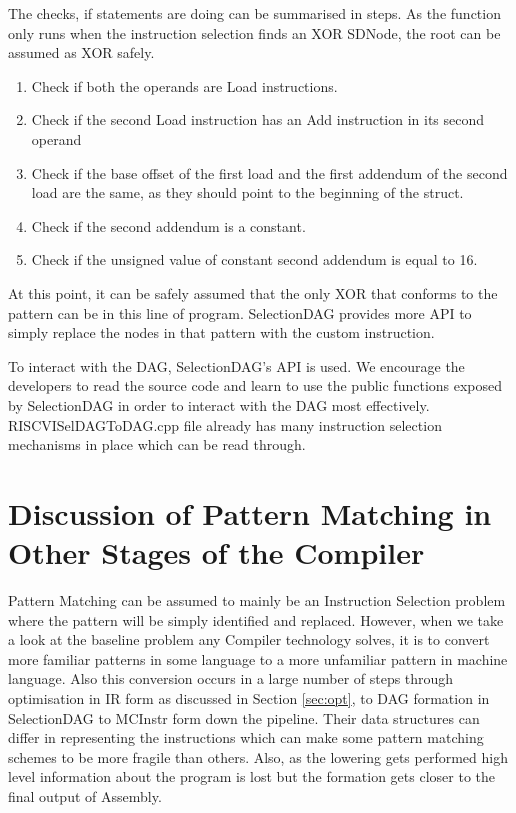The checks, if statements are doing can be summarised in steps. As the function only runs when the instruction selection finds an XOR SDNode, the root can be assumed as XOR safely.
\begin{enumerate}
    \item Check if both the operands are Load instructions.
    \item Check if the second Load instruction has an Add instruction in its second operand
    \item Check if the base offset of the first load and the first addendum of the second load are the same, as they should point to the beginning of the struct.
    \item Check if the second addendum is a constant.
    \item Check if the unsigned value of constant second addendum is equal to 16.
\end{enumerate}

At this point, it can be safely assumed that the only XOR that conforms to the pattern can be in this line of program. SelectionDAG provides more API to simply replace the nodes in that pattern with the custom instruction.


To interact with the DAG, SelectionDAG's API is used. We encourage the developers to read the source code and learn to use the public functions exposed by SelectionDAG in order to interact with the DAG most effectively. RISCVISelDAGToDAG.cpp file already has many instruction selection mechanisms in place which can be read through. 

\section{Discussion of Pattern Matching in Other Stages of the Compiler}
Pattern Matching can be assumed to mainly be an Instruction Selection problem where the pattern will be simply identified and replaced. However, when we take a look at the baseline problem any Compiler technology solves, it is to convert more familiar patterns in some language to a more unfamiliar pattern in machine language. Also this conversion occurs in a large number of steps through optimisation in IR form as discussed in Section \ref{sec:opt}, to DAG formation in SelectionDAG to MCInstr form down the pipeline. Their data structures can differ in representing the instructions which can make some pattern matching schemes to be more fragile than others. Also, as the lowering gets performed high level information about the program is lost but the formation gets closer to the final output of Assembly. 

